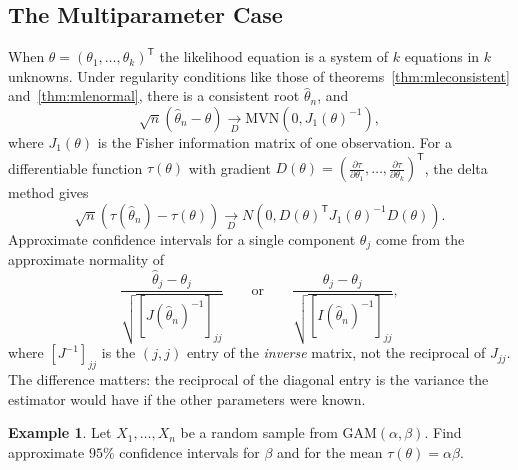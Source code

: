 \documentclass[12pt,a4paper]{report}
\theoremstyle{definition}
\newtheorem{exa}[thm]{Example}
\begin{document}
\subsection{The Multiparameter Case}

When $\theta = (\theta_1, \dots, \theta_k)^{\mathsf T}$ the likelihood equation is a
system of $k$ equations in $k$ unknowns. Under regularity conditions like those of
theorems~\ref{thm:mleconsistent} and~\ref{thm:mlenormal}, there is a consistent root
$\hat\theta_n$, and
\[\sqrt n\left(\hat\theta_n - \theta\right)\underset{D}{\longrightarrow}\text{MVN}\left(0, J_1(\theta)^{-1}\right),\]
where $J_1(\theta)$ is the Fisher information matrix of one observation. For a
differentiable function $\tau(\theta)$ with gradient
$D(\theta) = \left(\frac{\partial\tau}{\partial\theta_1}, \dots, \frac{\partial\tau}{\partial\theta_k}\right)^{\mathsf T}$,
the delta method gives
\[\sqrt n\left(\tau(\hat\theta_n) - \tau(\theta)\right)\underset{D}{\longrightarrow}N\left(0, D(\theta)^{\mathsf T}J_1(\theta)^{-1}D(\theta)\right).\]
Approximate confidence intervals for a single component $\theta_j$ come from the
approximate normality of
\[\frac{\hat\theta_j - \theta_j}{\sqrt{\left[J(\hat\theta_n)^{-1}\right]_{jj}}}\qquad\text{or}\qquad
\frac{\hat\theta_j - \theta_j}{\sqrt{\left[I(\hat\theta_n)^{-1}\right]_{jj}}},\]
where $\left[J^{-1}\right]_{jj}$ is the $(j, j)$ entry of the \emph{inverse} matrix, not
the reciprocal of $J_{jj}$. The difference matters: the reciprocal of the diagonal
entry is the variance the estimator would have if the other parameters were known.

\begin{exa}
\label{ex:gammaci}
Let $X_1, \dots, X_n$ be a random sample from $\text{GAM}(\alpha, \beta)$. Find
approximate $95\%$ confidence intervals for $\beta$ and for the mean
$\tau(\theta) = \alpha\beta$.
\end{exa}
\end{document}
